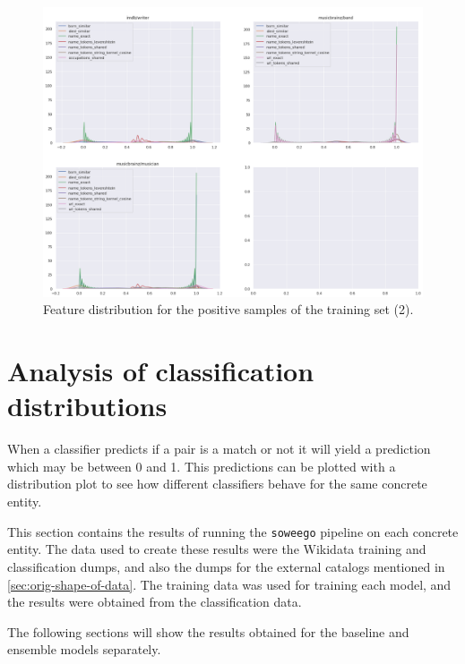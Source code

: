 \documentclass[epsfig,a4paper,11pt,titlepage,twoside,openany]{book}
\begin{document}
\begin{figure}[H]
      \centering
      \includegraphics[width=\linewidth]{features_distribution_positive_samples_2}
      \caption{Feature distribution for the positive samples of the training set (2).}
      \label{fig:distribution-of-training-positive-features-2}
\end{figure}

\section{Analysis of classification distributions}
\label{sec:apx-classification-results}



When a classifier predicts if a pair is a match or not it will yield a prediction which may be between 0 and 1. This predictions can be plotted with a distribution plot to see how different classifiers behave for the same concrete entity.

This section contains the results of running the \texttt{soweego} pipeline on each concrete entity. The data used to create these results were the Wikidata training and classification dumps, and also the dumps for the external catalogs mentioned in \autoref{sec:orig-shape-of-data}. The training data was used for training each model, and the results were obtained from the classification data.

The following sections will show the results obtained for the baseline and ensemble models separately.
\end{document}
